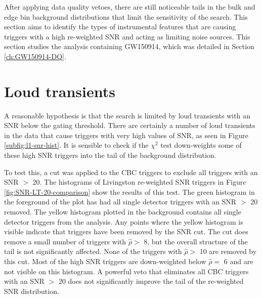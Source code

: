 After applying data quality vetoes, there are still noticeable tails in the bulk and edge bin
background distributions that limit the sensitivity of the search. This section aims to identify
the types of instrumental features that are causing triggers with a high re-weighted SNR
and acting as limiting noise sources. This section studies the analysis containing GW150914, which
was detailed in Section \ref{ch:GW150914-DQ}.

\section{Loud transients}

A reasonable hypothesis is that the search is limited by loud transients with an SNR below the
gating threshold. There are certainly a number of loud transients in the data that cause triggers
with very high values of SNR, as seen in Figure \ref{subfig:l1-snr-hist}. It is sensible to check if
the $\chi^{2}$ test down-weights some of these high SNR triggers into the tail of the background
distribution.

To test this, a cut was applied to the CBC triggers to exclude all triggers with an SNR
$>$ 20. The histograms of Livingston re-weighted SNR triggers in Figure \ref{fig:SNR-LT-20-comparison}
show the results of this test.
The green histogram in the foreground of the plot has had all single detector triggers
with an SNR $>$ 20 removed.
The yellow histogram plotted in the background contains all single detector triggers from the analysis.
Any points where the yellow histogram is visible indicate that triggers have been removed by the SNR
cut.
The cut does remove a small number of triggers with  $\hat{\rho} >$ 8, but the overall structure of
the tail is not significantly affected. None of the triggers with $\hat{\rho} >$ 10 are removed by
this cut. Most of the high SNR triggers are down-weighted below $\hat{\rho} =$ 6 and are not visible on
this histogram. A powerful veto that eliminates all CBC triggers
with an SNR $>$ 20 does not significantly improve the tail of the re-weighted SNR distribution.

